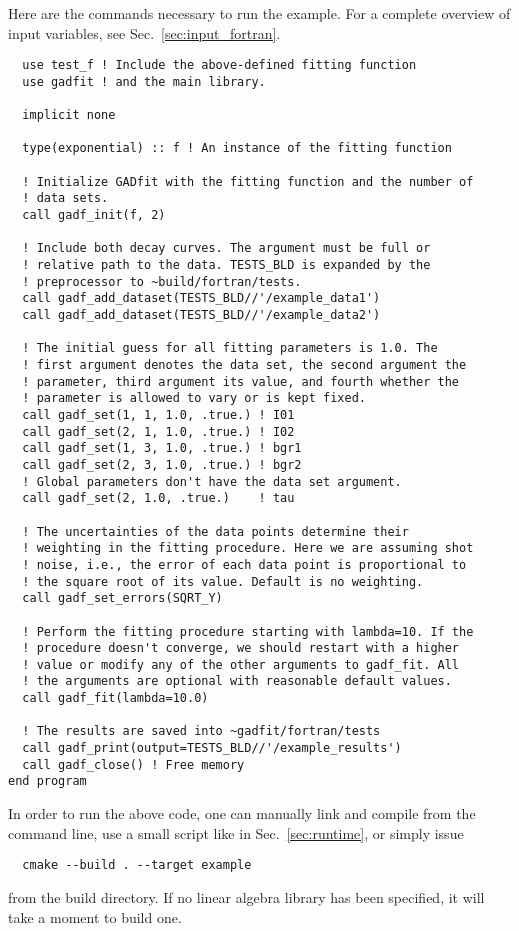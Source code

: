 \documentclass{article}
\begin{document}
Here are the commands necessary to run the example. For a complete overview of input variables, see Sec.~\ref{sec:input_fortran}.
\begin{verbatim}
  use test_f ! Include the above-defined fitting function
  use gadfit ! and the main library.

  implicit none

  type(exponential) :: f ! An instance of the fitting function

  ! Initialize GADfit with the fitting function and the number of
  ! data sets.
  call gadf_init(f, 2)

  ! Include both decay curves. The argument must be full or
  ! relative path to the data. TESTS_BLD is expanded by the
  ! preprocessor to ~build/fortran/tests.
  call gadf_add_dataset(TESTS_BLD//'/example_data1')
  call gadf_add_dataset(TESTS_BLD//'/example_data2')

  ! The initial guess for all fitting parameters is 1.0. The
  ! first argument denotes the data set, the second argument the
  ! parameter, third argument its value, and fourth whether the
  ! parameter is allowed to vary or is kept fixed.
  call gadf_set(1, 1, 1.0, .true.) ! I01
  call gadf_set(2, 1, 1.0, .true.) ! I02
  call gadf_set(1, 3, 1.0, .true.) ! bgr1
  call gadf_set(2, 3, 1.0, .true.) ! bgr2
  ! Global parameters don't have the data set argument.
  call gadf_set(2, 1.0, .true.)    ! tau

  ! The uncertainties of the data points determine their
  ! weighting in the fitting procedure. Here we are assuming shot
  ! noise, i.e., the error of each data point is proportional to
  ! the square root of its value. Default is no weighting.
  call gadf_set_errors(SQRT_Y)

  ! Perform the fitting procedure starting with lambda=10. If the
  ! procedure doesn't converge, we should restart with a higher
  ! value or modify any of the other arguments to gadf_fit. All
  ! the arguments are optional with reasonable default values.
  call gadf_fit(lambda=10.0)

  ! The results are saved into ~gadfit/fortran/tests
  call gadf_print(output=TESTS_BLD//'/example_results')
  call gadf_close() ! Free memory
end program
\end{verbatim}

In order to run the above code, one can manually link and compile from the command line, use a small script like in Sec.~\ref{sec:runtime}, or simply issue
\begin{verbatim}
  cmake --build . --target example
\end{verbatim}
from the build directory. If no linear algebra library has been specified, it will take a moment to build one.
\end{document}
